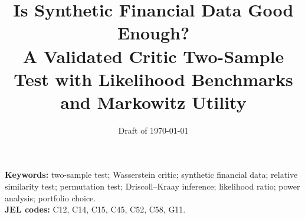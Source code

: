 \documentclass[11pt,a4paper]{article}
\title{Is Synthetic Financial Data Good Enough?\\[0.3em]
  \large A Validated Critic Two-Sample Test with Likelihood Benchmarks and Markowitz Utility}
\author{\todo{Author names and affiliations}}
\date{Draft of \today}
\theoremstyle{plain}
\theoremstyle{plain}
\numberwithin{equation}{section}
\begin{document}
\maketitle

\begin{abstract}

\end{abstract}

\noindent\textbf{Keywords:} two-sample test; Wasserstein critic; synthetic financial data;
relative similarity test; permutation test; Driscoll--Kraay inference; likelihood ratio; power
analysis; portfolio choice.\\
\noindent\textbf{JEL codes:} C12, C14, C15, C45, C52, C58, G11.















\clearpage
\appendix
{}   %

\end{document}
